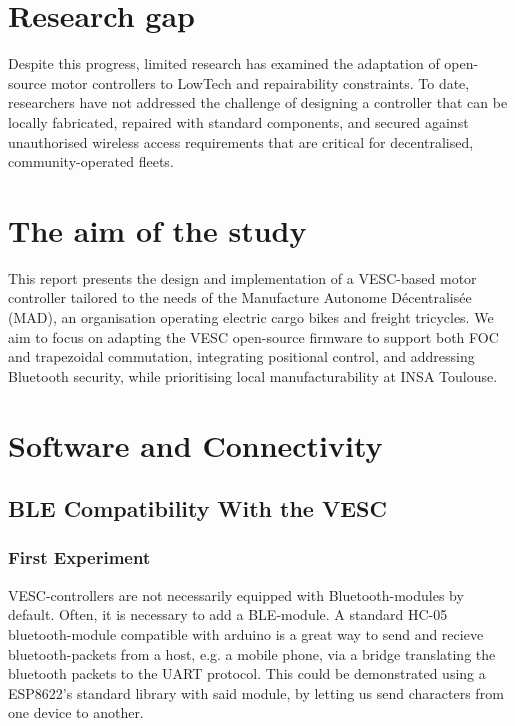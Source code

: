 \documentclass[conference]{IEEEtran}
\begin{document}
\section{Research gap}
Despite this progress, limited research has examined the adaptation of open-source motor controllers to LowTech and 
repairability constraints. To date, researchers have not addressed the challenge of designing a controller that can 
be locally fabricated, repaired with standard components, and secured against unauthorised wireless access requirements 
that are critical for decentralised, community-operated fleets.

\section{The aim of the study}
This report presents the design and implementation of a VESC-based motor controller tailored to the needs of the 
Manufacture Autonome Décentralisée (MAD), an organisation operating electric cargo bikes and freight tricycles. 
We aim to focus on adapting the VESC open-source firmware to support both FOC and trapezoidal commutation, integrating 
positional control, and addressing Bluetooth security, while prioritising local manufacturability at INSA Toulouse.

\section{Software and Connectivity}

\subsection{BLE Compatibility With the VESC}

\subsubsection{First Experiment}
VESC-controllers are not necessarily equipped with Bluetooth-modules by default. Often, it is necessary to add a 
BLE-module. A standard HC-05 bluetooth-module compatible with arduino is a great way to send and recieve 
bluetooth-packets from a host, e.g. a mobile phone, via a bridge translating the bluetooth packets to the UART protocol. 
This could be demonstrated using a ESP8622's standard library with said module, by letting us send characters from one 
device to another.
\end{document}
